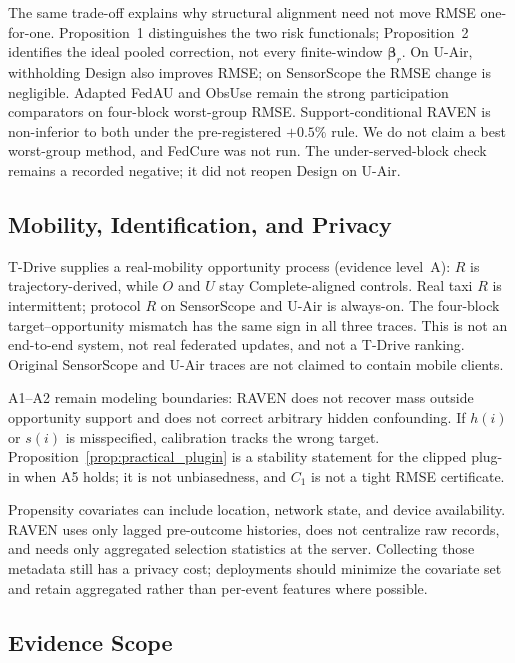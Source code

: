 \documentclass[letterpaper,journal]{IEEEtran}
\begin{document}
The same trade-off explains why structural alignment need not move RMSE
one-for-one.  Proposition~1 distinguishes the two risk functionals;
Proposition~2 identifies the ideal pooled correction, not every
finite-window $\boldsymbol\beta_r$.  On U-Air, withholding Design also
improves RMSE; on SensorScope the RMSE change is negligible.  Adapted
FedAU and ObsUse remain the strong participation comparators on
four-block worst-group RMSE.  Support-conditional RAVEN is non-inferior to both under
the pre-registered $+0.5\%$ rule.  We do not claim a best worst-group
method, and FedCure was not run.  The under-served-block check remains a
recorded negative; it did not reopen Design on U-Air.

\subsection{Mobility, Identification, and Privacy}
\label{subsec:discussion_boundaries}

T-Drive supplies a real-mobility opportunity process (evidence
level~A): $R$ is trajectory-derived, while $O$ and $U$ stay
Complete-aligned controls.  Real taxi $R$ is intermittent; protocol
$R$ on SensorScope and U-Air is always-on.  The four-block
target--opportunity mismatch has the same sign in all three traces.
This is not an end-to-end system, not real federated updates, and not a
T-Drive ranking.  Original SensorScope and U-Air traces are not claimed
to contain mobile clients.

A1--A2 remain modeling boundaries: RAVEN does not recover mass outside
opportunity support and does not correct arbitrary hidden confounding.
If $h(i)$ or $s(i)$ is misspecified, calibration tracks the wrong
target.  Proposition~\ref{prop:practical_plugin} is a stability
statement for the clipped plug-in when A5 holds; it is not
unbiasedness, and $C_1$ is not a tight RMSE certificate.

Propensity covariates can include location, network state, and device
availability.  RAVEN uses only lagged pre-outcome histories, does not
centralize raw records, and needs only aggregated selection statistics
at the server.  Collecting those metadata still has a privacy cost;
deployments should minimize the covariate set and retain aggregated
rather than per-event features where possible.

\subsection{Evidence Scope}
\label{subsec:discussion_evidence_limits}
\end{document}
